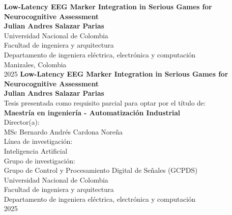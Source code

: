 \documentclass[12pt,enlgish,openany,twoside,letterpaper]{book}
\newcommand{\studentname}{}
\newcommand{\academictitle}{}
\newcommand{\resgroupone}{}
\newcommand{\researchtopic}{}
\newcommand{\thesisname}{}
\newcommand{\director}{}
\newcommand{\codirector}{}
\newcommand{\issuedate}{}
\newcommand{\sede}{}
\newcommand{\department}{}
\newcommand{\faculty}{}
\renewcommand{\studentname}{Julian Andres Salazar Parias}
\renewcommand{\thesisname}{Low-Latency EEG Marker Integration in Serious Games for Neurocognitive Assessment}
\renewcommand{\issuedate}{2025}
\renewcommand{\director}{MSc Bernardo Andrés Cardona Noreña}
\renewcommand{\academictitle}{Maestría en ingeniería - Automatización Industrial}
\renewcommand{\resgroupone}{Grupo de Control y Procesamiento Digital de Señales (GCPDS) }
\renewcommand{\researchtopic}{Inteligencia Artificial}
\renewcommand{\sede}{Manizales}
\renewcommand{\department}{Departamento de ingeniera eléctrica, electrónica y computación}
\renewcommand{\faculty}{Facultad de ingeniera y arquitectura}
\begin{document}
{\newpage
\thispagestyle{empty}
\begin{center}
\begin{figure}
\centering
{}%
\end{figure}
\vspace{2.5cm}
\textbf{\Huge \thesisname} \\ 
\vspace{2.5cm}
\textbf{\Large \studentname} \\
\vspace{5.0cm}
\small Universidad Nacional de Colombia \\
\faculty \\
\department \\
\sede, Colombia\\
\issuedate
\newpage 
\thispagestyle{empty}
\vspace{2.5cm}
\textbf{\Huge \thesisname} \\
\vspace{2.5cm}
\textbf{\Large \studentname} \\
\vspace{2.5cm}
\small Tesis presentada como requisito parcial para optar por el título de: \\
{\bfseries \academictitle}\\
\vspace{2.5cm}
Director(a): \\
\director \\
\vspace{2.5cm}
Línea de investigación: \\ 
\researchtopic\\
Grupo de investigación: \\
\resgroupone \\
\vspace{2.0cm} 
Universidad Nacional de Colombia \\
\faculty \\
\department \\
\issuedate
\end{center}

}
\end{document}
